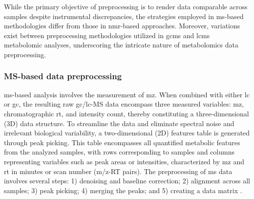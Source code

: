 \documentclass[ENG, BIB]{TFUOC}%
\begin{document}
While the primary objective of preprocessing is to render data comparable across samples despite instrumental discrepancies, the strategies employed in \gls{ms}-based methodologies differ from those in \gls{nmr}-based approaches. Moreover, variations exist between preprocessing methodologies utilized in \gls{gcms} and \gls{lcms} metabolomic analyses, underscoring the intricate nature of metabolomics data preprocessing.


\subsubsection{MS-based data preprocessing}

\gls{ms}-based analysis involves the measurement of \gls{mz}. When combined with either \gls{lc} or \gls{gc}, the resulting raw \gls{gc}/\gls{lc}-MS data encompass three measured variables: \gls{mz}, chromatographic \gls{rt}, and intensity count, thereby constituting a three-dimensional (3D) data structure.
To streamline the data and eliminate spectral noise and irrelevant biological variability, a two-dimensional (2D) features table is generated through peak picking. This table encompasses all quantified metabolic features from the analyzed samples, with rows corresponding to samples and columns representing variables such as peak areas or intensities, characterized by \gls{mz} and \gls{rt} in minutes or scan number (m/z-RT pairs).
The preprocessing of \gls{ms} data involves several steps: 1) denoising and baseline correction; 2) alignment across all samples; 3) peak picking; 4) merging the peaks; and 5) creating a data matrix \cite{chenGuideMetabolomicsAnalysis2022a,sunPretreatingNormalizingMetabolomics2024,xiaoMetaboliteIdentificationQuantitation2012, defernezChapterElevenStrategies2013,troisiChapterDataAnalysis2022,burtonInstrumentalExperimentalEffects2008,trygg01BackgroundEstimation2009,alonsoAnalyticalMethodsUntargeted2015,bloembergWarpingMethodsSpectroscopic2013}.
\end{document}
